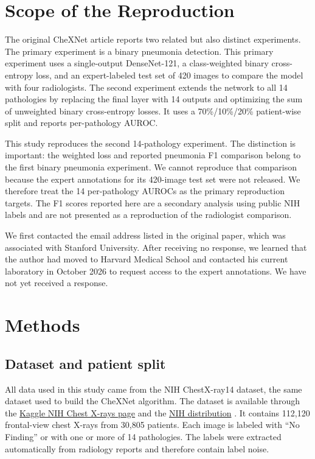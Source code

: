 \section{Scope of the Reproduction}

The original CheXNet article reports two related but also distinct experiments. The
primary experiment is a binary pneumonia detection. This primary experiment uses a single-output
DenseNet-121, a class-weighted binary cross-entropy loss, and an expert-labeled
test set of 420 images to compare the model with four radiologists. The second
experiment extends the network to all 14 pathologies by replacing the final
layer with 14 outputs and optimizing the sum of unweighted binary
cross-entropy losses. It uses a 70\%/10\%/20\% patient-wise split and reports
per-pathology AUROC.

This study reproduces the second 14-pathology experiment. The distinction is
important: the weighted loss and reported pneumonia F1 comparison belong to
the first binary pneumonia experiment. We cannot reproduce that comparison
because the expert annotations for its 420-image test set were not released.
We therefore treat the 14 per-pathology AUROCs as the primary reproduction
targets. The F1 scores reported here are a secondary analysis using public NIH
labels and are not presented as a reproduction of the radiologist comparison.

We first contacted the email address listed in the original paper, which
was associated with Stanford University. After receiving no response, we
learned that the author had moved to Harvard Medical School and contacted his
current laboratory in October 2026 to request access to the expert annotations.
We have not yet received a response.

\section{Methods}

\subsection{Dataset and patient split}

All data used in this study came from the NIH ChestX-ray14 dataset, the same
dataset used to build the CheXNet algorithm. The dataset is available through
the \href{https://www.kaggle.com/datasets/nih-chest-xrays/data}{Kaggle NIH
Chest X-rays page}\cite{nihxray2017} and the
\href{https://nihcc.app.box.com/v/ChestXray-NIHCC}{NIH distribution}
\cite{nihpress2017}. It contains 112,120 frontal-view chest X-rays from 30,805
patients. Each image is labeled with ``No Finding'' or with one or more of 14
pathologies. The labels were extracted automatically from radiology reports
and therefore contain label noise.

